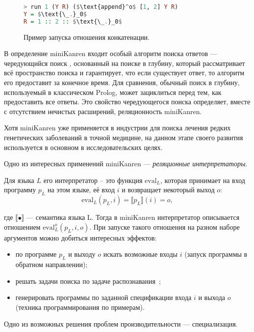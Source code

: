 \begin{figure}[h!]
\begin{lstlisting}[mathescape,language=Haskell,extendedchars=\true,frame=single,basicstyle=\ttfamily]
> run 1 (Y R) ($\text{append}^o$ [1, 2] Y R)
Y = $\text{\_.}_0$
R = 1 :: 2 :: $\text{\_.}_0$
\end{lstlisting}
\caption{Пример запуска отношения конкатенации.}
\label{fig:appendoExample}
\end{figure}

В определение miniKanren входит особый алгоритм поиска ответов --- чередующийся поиск ,
основанный на поиске в глубину, который рассматривает всё пространство поиска и гарантирует,
что если существует ответ, то алгоритм его предоставит за конечное время.
Для сравнения, обычный поиск в глубину, используемый в классическом Prolog, может зациклиться
перед тем, как предоставить все ответы. Это свойство чередующегося поиска определяет, вместе
с отсутствием нечистых расширений, реляционность miniKanren. 

Хотя miniKanren уже применяется в индустрии для поиска лечения редких генетических
заболеваний в точной медицине\cite{medMK},
на данном этапе своего развития используется в основном в исследовательских целях.

Одно из интересных применений miniKanren --- {\it реляционные интерпретаторы}.

Для языка $L$ его интерпретатор -- это функция $\text{eval}_L$, которая принимает
на вход программу $p_L$ на этом языке, её вход $i$ и возвращает некоторый выход $o$:
\[ \text{eval}_L (p_L, i) = \llbracket p_L \rrbracket (i) = o, \]

где $\llbracket \bullet \rrbracket $ --- семантика языка L.
Тогда в miniKanren интерпретатор описывается отношением $\text{eval}^o_L(p_L, i, o)$.
При запуске такого отношения на разном наборе аргументов можно добиться интересных эффектов:
\begin{itemize}
\item по программе $p_L$ и выходу $o$ искать возможные входы $i$ (запуск программы в обратном направлении);
\item решать задачи поиска по задаче распознавания~\cite{lozov};
\item генерировать программы по заданной спецификации входа $i$ и выхода $o$
(техника программирования по примерам)\cite{unifiedMK}.
\end{itemize}


Одно из возможных решения проблем производительности --- специализация.
